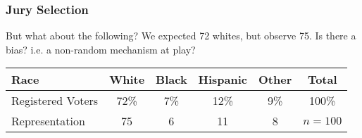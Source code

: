 \documentclass[handout]{beamer}
\begin{document}
\begin{frame}[fragile]
\frametitle{Jury Selection}
But what about the following?  We expected 72 whites, but observe 75.  Is there a bias?  i.e. a non-random mechanism at play?

\begin{center}
\begin{tabular}{l||cccc|c}
Race & White & Black & Hispanic & Other & Total \\ 
\hline
Registered Voters & 72\% & 7\% & 12\% & 9\% & 100\%\\ 
Representation & 75 & 6 & 11 & 8 & $n=100$ \\ 
\end{tabular}
\end{center}

\end{frame}
\end{document}
